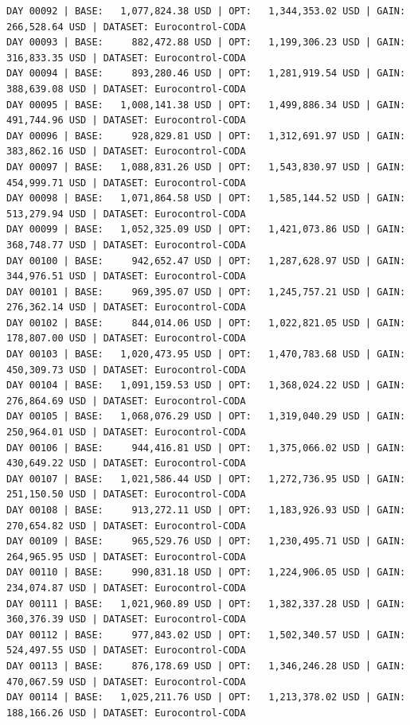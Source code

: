 \documentclass[11pt,a4paper]{article}
\begin{document}
\begin{verbatim}
DAY 00092 | BASE:   1,077,824.38 USD | OPT:   1,344,353.02 USD | GAIN: 266,528.64 USD | DATASET: Eurocontrol-CODA
DAY 00093 | BASE:     882,472.88 USD | OPT:   1,199,306.23 USD | GAIN: 316,833.35 USD | DATASET: Eurocontrol-CODA
DAY 00094 | BASE:     893,280.46 USD | OPT:   1,281,919.54 USD | GAIN: 388,639.08 USD | DATASET: Eurocontrol-CODA
DAY 00095 | BASE:   1,008,141.38 USD | OPT:   1,499,886.34 USD | GAIN: 491,744.96 USD | DATASET: Eurocontrol-CODA
DAY 00096 | BASE:     928,829.81 USD | OPT:   1,312,691.97 USD | GAIN: 383,862.16 USD | DATASET: Eurocontrol-CODA
DAY 00097 | BASE:   1,088,831.26 USD | OPT:   1,543,830.97 USD | GAIN: 454,999.71 USD | DATASET: Eurocontrol-CODA
DAY 00098 | BASE:   1,071,864.58 USD | OPT:   1,585,144.52 USD | GAIN: 513,279.94 USD | DATASET: Eurocontrol-CODA
DAY 00099 | BASE:   1,052,325.09 USD | OPT:   1,421,073.86 USD | GAIN: 368,748.77 USD | DATASET: Eurocontrol-CODA
DAY 00100 | BASE:     942,652.47 USD | OPT:   1,287,628.97 USD | GAIN: 344,976.51 USD | DATASET: Eurocontrol-CODA
DAY 00101 | BASE:     969,395.07 USD | OPT:   1,245,757.21 USD | GAIN: 276,362.14 USD | DATASET: Eurocontrol-CODA
DAY 00102 | BASE:     844,014.06 USD | OPT:   1,022,821.05 USD | GAIN: 178,807.00 USD | DATASET: Eurocontrol-CODA
DAY 00103 | BASE:   1,020,473.95 USD | OPT:   1,470,783.68 USD | GAIN: 450,309.73 USD | DATASET: Eurocontrol-CODA
DAY 00104 | BASE:   1,091,159.53 USD | OPT:   1,368,024.22 USD | GAIN: 276,864.69 USD | DATASET: Eurocontrol-CODA
DAY 00105 | BASE:   1,068,076.29 USD | OPT:   1,319,040.29 USD | GAIN: 250,964.01 USD | DATASET: Eurocontrol-CODA
DAY 00106 | BASE:     944,416.81 USD | OPT:   1,375,066.02 USD | GAIN: 430,649.22 USD | DATASET: Eurocontrol-CODA
DAY 00107 | BASE:   1,021,586.44 USD | OPT:   1,272,736.95 USD | GAIN: 251,150.50 USD | DATASET: Eurocontrol-CODA
DAY 00108 | BASE:     913,272.11 USD | OPT:   1,183,926.93 USD | GAIN: 270,654.82 USD | DATASET: Eurocontrol-CODA
DAY 00109 | BASE:     965,529.76 USD | OPT:   1,230,495.71 USD | GAIN: 264,965.95 USD | DATASET: Eurocontrol-CODA
DAY 00110 | BASE:     990,831.18 USD | OPT:   1,224,906.05 USD | GAIN: 234,074.87 USD | DATASET: Eurocontrol-CODA
DAY 00111 | BASE:   1,021,960.89 USD | OPT:   1,382,337.28 USD | GAIN: 360,376.39 USD | DATASET: Eurocontrol-CODA
DAY 00112 | BASE:     977,843.02 USD | OPT:   1,502,340.57 USD | GAIN: 524,497.55 USD | DATASET: Eurocontrol-CODA
DAY 00113 | BASE:     876,178.69 USD | OPT:   1,346,246.28 USD | GAIN: 470,067.59 USD | DATASET: Eurocontrol-CODA
DAY 00114 | BASE:   1,025,211.76 USD | OPT:   1,213,378.02 USD | GAIN: 188,166.26 USD | DATASET: Eurocontrol-CODA

\end{verbatim}
\end{document}
